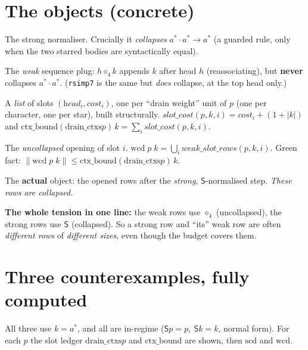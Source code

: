 \documentclass{article}
\newcommand{\rs}[1]{\lvert #1\rvert}                 %
\newcommand{\rss}[1]{\lVert #1\rVert}                %
\newcommand{\sd}{\mathrm{scd}}                       %
\newcommand{\wcd}{\mathrm{wcd}}                        %
\newcommand{\ctxb}{\mathrm{ctx\_bound}}
\newcommand{\dctx}{\mathrm{drain\_ctxs}}
\newcommand{\SOL}{\mathrm{SOL}}
\newcommand{\Strong}{\mathsf{S}}                     %
\newcommand{\rfour}{\mathbin{\diamond_4}}            %
\newcommand{\seq}{\cdot}
\begin{document}
\section{The objects (concrete)}
\begin{description}[leftmargin=1.2em,itemsep=2pt]
\item[$\Strong$ (\texttt{rsimpStrong\_raw}).] The strong normaliser. Crucially it \emph{collapses}
  $a^{*}\seq a^{*}\to a^{*}$ (a guarded rule, only when the two starred bodies are syntactically equal).
\item[$\rfour$ (\texttt{rsimp4\_SEQ\_atom}).] The \emph{weak} sequence plug: $h\rfour k$ appends $k$
  after head $h$ (reassociating), but \textbf{never} collapses $a^{*}\seq a^{*}$. (\texttt{rsimp7} is
  the same but \emph{does} collapse, at the top head only.)
\item[$\dctx\;p$.] A \emph{list} of slots $(\textit{head}_i,\textit{cost}_i)$, one per ``drain weight''
  unit of $p$ (one per character, one per star), built structurally.
  $\textit{slot\_cost}(p,k,i)=\textit{cost}_i+(1+\rs{k})$ and $\ctxb(\dctx p)\,k=\sum_i \textit{slot\_cost}(p,k,i)$.
\item[$\textit{weak\_slot\_rows}(p,k,i) = \mathrm{rows}(\,\textit{head}_i\rfour k\,)\setminus\mathrm{rows}(k)$.]
  The \emph{uncollapsed} opening of slot $i$. $\wcd\;p\;k=\bigcup_i \textit{weak\_slot\_rows}(p,k,i)$.
  Green fact: $\rss{\wcd\;p\;k}\le \ctxb(\dctx p)\,k$.
\item[$\sd\;p\;k = \SOL(\textit{nseq}\;p\;k)\setminus\SOL(\Strong k)$.] The \textbf{actual} object:
  the opened rows after the \emph{strong}, $\Strong$-normalised step. \emph{These rows are collapsed.}
\end{description}
\noindent\textbf{The whole tension in one line:} the weak rows use $\rfour$ (uncollapsed), the strong
rows use $\Strong$ (collapsed). So a strong row and ``its'' weak row are often \emph{different rows} of
\emph{different sizes}, even though the budget covers them.

\section{Three counterexamples, fully computed}
All three use $k=a^{*}$, and all are in-regime ($\Strong p=p,\ \Strong k=k$, normal form). For each
$p$ the slot ledger $\dctx p$ and $\ctxb$ are shown, then $\sd$ and $\wcd$.
\end{document}
